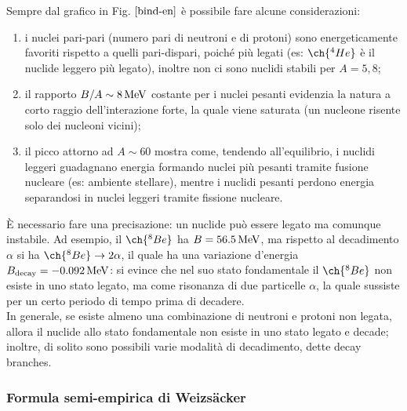 Sempre dal grafico in Fig. $ \ref{bind-en} $ è possibile fare alcune considerazioni:
\begin{enumerate}
	\item i nuclei pari-pari (numero pari di neutroni e di protoni) sono energeticamente favoriti rispetto a quelli pari-dispari, poiché più legati (es: $ \ch{^{4}He} $ è il nuclide leggero più legato), inoltre non ci sono nuclidi stabili per $ A = 5,8 $;
	\item il rapporto $ B/A \sim 8\,\mathrm{MeV} $ costante per i nuclei pesanti evidenzia la natura a corto raggio dell'interazione forte, la quale viene saturata (un nucleone risente solo dei nucleoni vicini);
	\item il picco attorno ad $ A \sim 60 $ mostra come, tendendo all'equilibrio, i nuclidi leggeri guadagnano energia formando nuclei più pesanti tramite fusione nucleare (es: ambiente stellare), mentre i nuclidi pesanti perdono energia separandosi in nuclei leggeri tramite fissione nucleare.
\end{enumerate}
È necessario fare una precisazione: un nuclide può essere legato ma comunque instabile. Ad esempio, il $ \ch{^8 Be} $ ha $ B = 56.5\,\mathrm{MeV} $, ma rispetto al decadimento $ \alpha $ si ha $ \ch{^8 Be} \rightarrow 2\alpha $, il quale ha una variazione d'energia $ B_{\text{decay}} = - 0.092\,\mathrm{MeV} $: si evince che nel suo stato fondamentale il $ \ch{^8 Be} $ non esiste in uno stato legato, ma come risonanza di due particelle $ \alpha $, la quale sussiste per un certo periodo di tempo prima di decadere.\\
In generale, se esiste almeno una combinazione di neutroni e protoni non legata, allora il nuclide allo stato fondamentale non esiste in uno stato legato e decade; inoltre, di solito sono possibili varie modalità di decadimento, dette decay branches.

\subsubsection{Formula semi-empirica di Weizsäcker}

